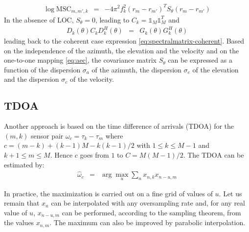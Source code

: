 \documentclass[graybox]{svmult/styles/svmult}
\def\bun{\mathds{1}}
\def\hat{\widehat}
\def\msc{\mathrm{MSC}}
\begin{document}
\begin{eqnarray}
\label{eq:log-coherence}
 \log \msc_{m,m',k}&=& -4\pi^2f_{k}^2 (r_{m}-r_{m'})^TS_{\theta}(r_{m}-r_{m'})
\end{eqnarray}
In the absence of LOC, $S_{\theta}=0$, leading to $C_{k}=\bun_{M}\bun_{M}^{T}$ and 
\begin{eqnarray*}
D_{k}(\theta)C_{k}D^{H}_{k}(\theta)&=&G_{k}(\theta)G^{H}_{k}(\theta)
\end{eqnarray*}
leading back to the coherent case expression \eqref{eq:spectralmatrix-coherent}.  Based on the independence of the azimuth, the elevation and the velocity and on the one-to-one mapping \eqref{eq:aec}, the covariance matrix $S_{\theta}$ can be expressed as a function of the dispersion $\sigma_{a}$ of the azimuth, the dispersion $\sigma_{e}$ of the elevation and the dispersion $\sigma_{c}$ of the velocity.

 
\subsection{TDOA}
Another approach is based on the time difference of arrivals (TDOA) for the $(m,k)$ sensor pair 
$\omega_{c}=\tau_{k}-\tau_{m}$
where
$c=(m-k) + (k-1)M -k(k-1)/2$ with $1\leq k\leq M-1$ and $k+1\leq m \leq M$. Hence $c$ goes from $1$ to $C=M(M-1)/2$.
The TDOA can be estimated by:
\begin{eqnarray}
 \label{eq:intercorrkm}
\hat \omega_{c}&=& \arg\max_{u}\sum_{n} x_{n,k}x_{n-u,m}
\end{eqnarray}

In practice, the maximization is carried out on a fine grid of values of $u$. Let us remain that $x_{n}$ can be interpolated with any oversampling rate and, for any real value of $u$, $x_{n-u,m}$ can be performed, according to the sampling theorem, from the values $x_{n,m}$. The maximum can also be improved by parabolic interpolation.
\end{document}
